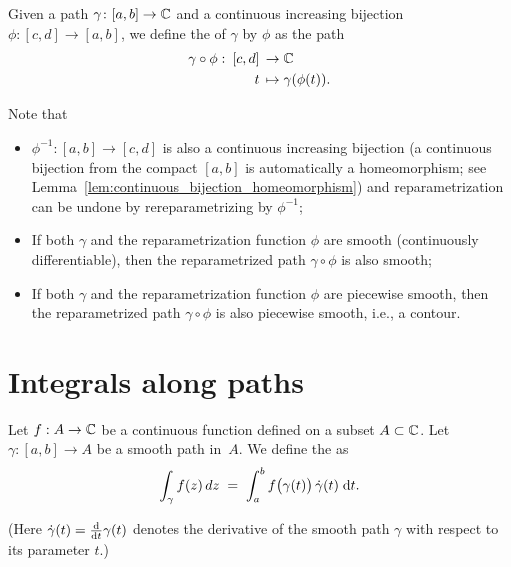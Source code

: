 \begin{definition}
  \label{def:path_reparametrization}
  Given a path $\gamma \colon [a,b] \to \mathbb{C}$ and a continuous increasing
  bijection $\phi \colon [c,d] \to [a,b]$, we define the 
  of $\gamma$ by $\phi$ as the path
  \begin{align*}
    \gamma \circ \phi \, \colon \, [c,d] \, \to \; & \mathbb{C} \\
    t \, \mapsto \; & \gamma(\phi(t)) .
  \end{align*}

  Note that
  \begin{itemize}
    \item $\phi^{-1} \colon [a,b] \to [c,d]$ is also a continuous increasing
      bijection (a continuous bijection from the
      compact $[a,b]$ is automatically a homeomorphism; see
      Lemma~\ref{lem:continuous_bijection_homeomorphism}) and
      reparametrization can be undone by rereparametrizing by $\phi^{-1}$;
      \item If both $\gamma$ and the reparametrization function $\phi$ are
      smooth (continuously differentiable), then the reparametrized
      path $\gamma \circ \phi$ is also smooth;
      \item If both $\gamma$ and the reparametrization function $\phi$ are
      piecewise smooth, then the reparametrized path $\gamma \circ \phi$
      is also piecewise smooth, i.e., a contour.
  \end{itemize}
\end{definition}



\section{Integrals along paths}

\begin{definition}
  \label{def:smooth_contour_integral}
  Let $f : A \to \mathbb{C}$ be a continuous function defined on a subset $A \subset \mathbb{C}$.
  Let $\gamma \colon [a,b] \to A$ be a smooth path in~$A$.
  We define the  as
  \begin{align*}
    \int_\gamma f(z) \, dz
    \; = \; \int_a^b f \big( \gamma(t) \big) \, \dot{\gamma}(t) \; \mathrm{d} t .
  \end{align*}

  (Here $\dot{\gamma}(t) = \frac{\mathrm{d}}{\mathrm{d} t} \gamma(t)$ denotes the derivative of
  the smooth path $\gamma$ with respect to its parameter $t$.)
\end{definition}

